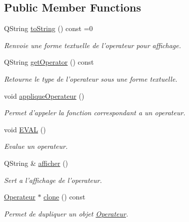 \subsection*{\-Public \-Member \-Functions}
\begin{DoxyCompactItemize}
\item 
\-Q\-String \hyperlink{class_l_o21_1_1_operateur_a145a86591719c4c74043b05b21722b6e}{to\-String} () const =0
\begin{DoxyCompactList}\small\item\em \-Renvoie une forme textuelle de l'operateur pour affichage. \end{DoxyCompactList}\item 
\-Q\-String \hyperlink{class_l_o21_1_1_operateur_a67c0aa762a71a3dbdb7da4bd8c2ec91d}{get\-Operator} () const 
\begin{DoxyCompactList}\small\item\em \-Retourne le type de l'operateur sous une forme textuelle. \end{DoxyCompactList}\item 
\hypertarget{class_l_o21_1_1_operateur_a93fba96ab13c5c65a426d717fbe6a3ae}{void \hyperlink{class_l_o21_1_1_operateur_a93fba96ab13c5c65a426d717fbe6a3ae}{applique\-Operateur} ()}\label{class_l_o21_1_1_operateur_a93fba96ab13c5c65a426d717fbe6a3ae}

\begin{DoxyCompactList}\small\item\em \-Permet d'appeler la fonction correspondant a un operateur. \end{DoxyCompactList}\item 
\hypertarget{class_l_o21_1_1_operateur_ad82cb92a05c6a0479f05369c5a33121b}{void \hyperlink{class_l_o21_1_1_operateur_ad82cb92a05c6a0479f05369c5a33121b}{\-E\-V\-A\-L} ()}\label{class_l_o21_1_1_operateur_ad82cb92a05c6a0479f05369c5a33121b}

\begin{DoxyCompactList}\small\item\em \-Evalue un operateur. \end{DoxyCompactList}\item 
\-Q\-String \& \hyperlink{class_l_o21_1_1_operateur_a8104fb7f3d740dde10c2e7c4bb2ba660}{afficher} ()
\begin{DoxyCompactList}\small\item\em \-Sert a l'affichage de l'operateur. \end{DoxyCompactList}\item 
\hyperlink{class_l_o21_1_1_operateur}{\-Operateur} $\ast$ \hyperlink{class_l_o21_1_1_operateur_aabf23ebda8447811b12db2f2e174b9d1}{clone} () const 
\begin{DoxyCompactList}\small\item\em \-Permet de dupliquer un objet \hyperlink{class_l_o21_1_1_operateur}{\-Operateur}. \end{DoxyCompactList}\end{DoxyCompactItemize}
